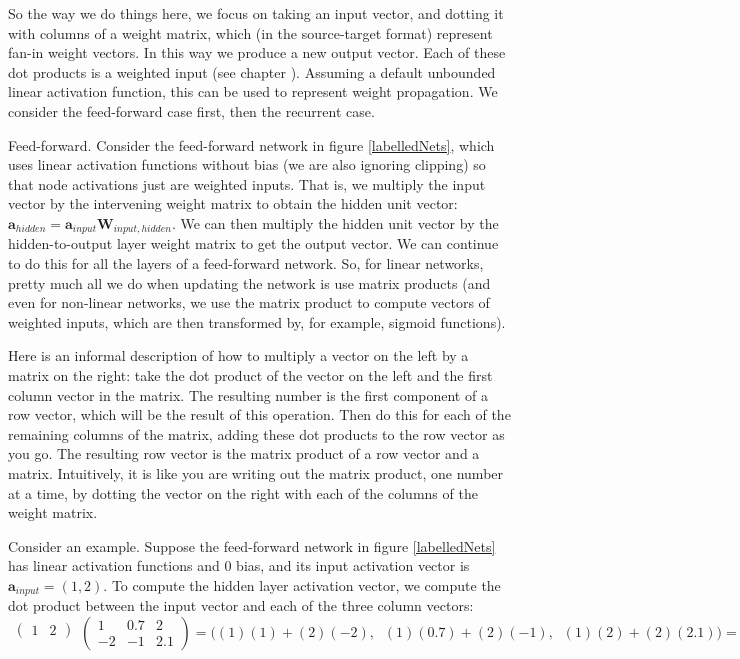 So the way we do things here, we focus on taking an input vector, and dotting it with columns of a weight matrix, which (in the source-target format) represent fan-in weight vectors. In this way we produce a new output vector. Each of these dot products is a weighted input (see chapter ). Assuming a default unbounded linear activation function, this can be used to represent weight propagation. We consider the feed-forward case first, then the recurrent case.

Feed-forward. Consider the feed-forward network in figure \ref{labelledNets}, which uses linear activation functions without bias (we are also ignoring clipping) so that node activations just are weighted inputs. That is, we multiply the input vector by the intervening weight matrix to obtain the hidden unit vector:  $\textbf{a}_{hidden} = \textbf{a}_{input} \textbf{W}_{input,hidden}$. We can then multiply the hidden unit vector by the hidden-to-output layer weight matrix to get the output vector. We can continue to do this for all the layers of a feed-forward network. So, for linear networks, pretty much all we do when updating the network is use matrix products (and even for non-linear networks, we use the matrix product to compute vectors of weighted inputs, which are then transformed by, for example, sigmoid functions).

Here is an informal description of how to multiply a vector on the left by a matrix on the right: take the dot product of the vector on the left and the first column vector in the matrix. The resulting number is the first component of a row vector, which will be the result of this operation. Then do this for each of the remaining columns of the matrix, adding these dot products to the row vector as you go. The resulting row vector is the matrix product of a row vector and a matrix. Intuitively, it is like you are writing out the matrix product, one number at a time, by dotting the vector on the right with each of the columns of the weight matrix.

Consider an example. Suppose the feed-forward network in figure \ref{labelledNets} has linear activation functions and 0 bias, and its input activation vector is $\textbf{a}_{input} = (1,2)$. To compute the hidden layer activation vector, we compute the dot product between the input vector and each of the three column vectors:
\[
  \begin{matrix}\begin{pmatrix}1 & 2\end{pmatrix}\\\mbox{}\end{matrix}
  \begin{pmatrix} 1 & 0.7 & 2 \\ -2 & -1 & 2.1 \end{pmatrix} 
  =
  \bigg( (1)(1) + (2)(-2) ,\;\; (1)(0.7) + (2)(-1) ,\;\; (1)(2)+ (2)(2.1) \bigg)
  =
  \begin{pmatrix}  -3 \;\; -1.3 \;\;\; 6.2  \end{pmatrix}
\]
\vspace*{.1cm} 

